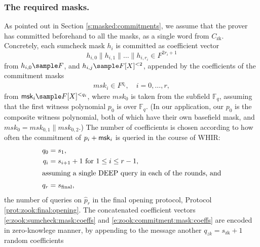 


\subsubsection{The required masks.}
As pointed out in Section \ref{s:masked:commitments}, we assume that the prover has committed beforehand to all the masks, as a single word from $C_\text{zk}$.
Concretely, each sumcheck mask $h_i$ is committed as coefficient vector 
\begin{equation}
\label{e:zook:sumcheck:mask:coeffs}
h_{i,0}\| h_{i,1} \| \ldots\| h_{i,r_i} \in F^{2 r_i + 1}
\end{equation}
from $h_{i,0}\sample F$, and $h_{i,j}\sample F[X]^{<2}$, appended by the coefficients of the commitment masks \begin{align}
\label{e:zook:commitment:mask:coeffs}
msk_i \in F^{q_i},  \quad i=0,\ldots,r,
\end{align}
from $\msk_i \sample F[X]^{< q_i}$, where $msk_0$ is taken from the subfield $\mathbb F_q$, assuming that the first witness polynomial $p_0$ is over $\mathbb F_q$.
(In our application, our $p_0$ is the composite witness polynomial, both of which have their own basefield mask, and $msk_0 = msk_{0,1} \| msk_{0,2}$.)
The number of coefficients is chosen according to how often the commitment of $p_i + \mathsf{msk}_i$ is queried in the course of WHIR:
\begin{align}
q_0 &= s_{1}, 
\\
q_i &= s_{i+1} + 1 \text{ for } 1\leq i\leq r-1,
\\\intertext{assuming a single DEEP query in each of the rounds, and}
q_r &= s_\text{final},
\end{align}
the number of queries on $\hat p_r$ in the final opening protocol, Protocol \ref{prot:zook:final:opening}.
The concatenated coefficient vectors \eqref{e:zook:sumcheck:mask:coeffs} and \eqref{e:zook:commitment:mask:coeffs} are encoded in zero-knowlege manner, by appending to the message another $q_{zk} = s_\text{zk} + 1$ random coefficients
